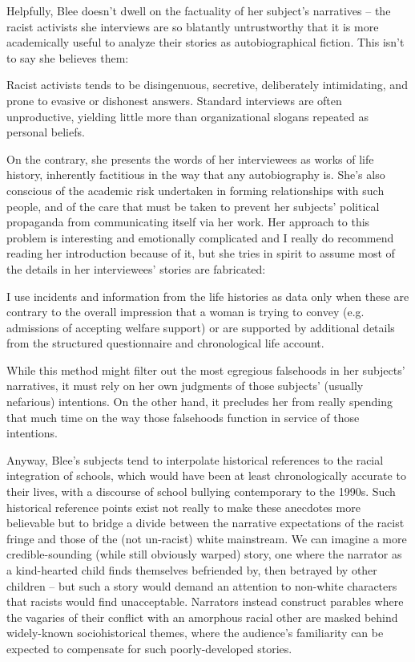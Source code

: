 \documentclass[11pt]{article}
\begin{document}
Helpfully, Blee doesn't dwell on the factuality of her subject's narratives -- the racist activists she interviews are so blatantly untrustworthy that it is more academically useful to analyze their stories as autobiographical fiction. This isn't to say she believes them:
\begin{displayquote}
    Racist activists tends to be disingenuous, secretive, deliberately intimidating, and prone to evasive or dishonest answers. Standard interviews are often unproductive, yielding little more than organizational slogans repeated as personal beliefs.\autocite[201]{Bl02}
\end{displayquote}
On the contrary, she presents the words of her interviewees as works of life history, inherently factitious in the way that any autobiography is. She's also conscious of the academic risk undertaken in forming relationships with such people, and of the care that must be taken to prevent her subjects' political propaganda from communicating itself via her work. Her approach to this problem is interesting and emotionally complicated and I really do recommend reading her introduction because of it, but she tries in spirit to assume most of the details in her interviewees' stories are fabricated:
\begin{displayquote}
    I use incidents and information from the life histories as data only when these are contrary to the overall impression that a woman is trying to convey (e.g. admissions of accepting welfare support) or are supported by additional details from the structured questionnaire and chronological life account.\autocite[203]{Bl02}
\end{displayquote}
While this method might filter out the most egregious falsehoods in her subjects' narratives, it must rely on her own judgments of those subjects' (usually nefarious) intentions. On the other hand, it precludes her from really spending that much time on the way those falsehoods function in service of those intentions. 

Anyway, Blee's subjects tend to interpolate historical references to the racial integration of schools, which would have been at least chronologically accurate to their lives, with a discourse of school bullying contemporary to the 1990s. Such historical reference points exist not really to make these anecdotes more believable but to bridge a divide between the narrative expectations of the racist fringe and those of the (not un-racist) white mainstream. We can imagine a more credible-sounding (while still obviously warped) story, one where the narrator as a kind-hearted child finds themselves befriended by, then betrayed by other children -- but such a story would demand an attention to non-white characters that racists would find unacceptable. Narrators instead construct parables where the vagaries of their conflict with an amorphous racial other are masked behind widely-known sociohistorical themes, where the audience's familiarity can be expected to compensate for such poorly-developed stories. 
\end{document}
